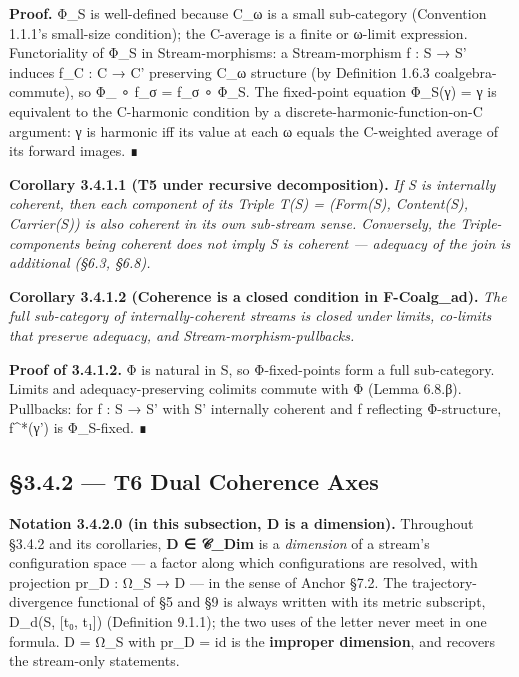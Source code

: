 \documentclass[11pt, openany]{book}
\begin{document}
\textbf{Proof.} Φ\_\allowbreak{}S is well-defined because C\_\allowbreak{}ω is a small sub-category (Convention 1.1.1's small-size condition); the C-average is a finite or ω-limit expression. Functoriality of Φ\_\allowbreak{}S in Stream-morphisms: a Stream-morphism f : S → S' induces f\_\allowbreak{}C : C → C' preserving C\_\allowbreak{}ω structure (by Definition 1.6.3 coalgebra-commute), so Φ\_ ∘ f\_\allowbreak{}σ = f\_\allowbreak{}σ ∘ Φ\_\allowbreak{}S. The fixed-point equation Φ\_\allowbreak{}S(γ) = γ is equivalent to the C-harmonic condition by a discrete-harmonic-function-on-C argument: γ is harmonic iff its value at each ω equals the C-weighted average of its forward images. ∎

\textbf{Corollary 3.4.1.1 (T5 under recursive decomposition).} \textit{If S is internally coherent, then each component of its Triple T(S) = (Form(S), Content(S), Carrier(S)) is also coherent in its own sub-stream sense. Conversely, the Triple-components being coherent does not imply S is coherent --- adequacy of the join is additional (§6.3, §6.8).}

\textbf{Corollary 3.4.1.2 (Coherence is a closed condition in F-Coalg\_\allowbreak{}ad).} \textit{The full sub-category of internally-coherent streams is closed under limits, co-limits that preserve adequacy, and Stream-morphism-pullbacks.}

\textbf{Proof of 3.4.1.2.} Φ is natural in S, so Φ-fixed-points form a full sub-category. Limits and adequacy-preserving colimits commute with Φ (Lemma 6.8.β). Pullbacks: for f : S → S' with S' internally coherent and f reflecting Φ-structure, f\textasciicircum{}*(γ') is Φ\_\allowbreak{}S-fixed. ∎

\subsection{§3.4.2 --- T6 Dual Coherence Axes}

\textbf{Notation 3.4.2.0 (in this subsection, D is a dimension).} Throughout §3.4.2 and its corollaries, \textbf{D ∈ 𝒞\_\allowbreak{}Dim} is a \textit{dimension} of a stream's configuration space --- a factor along which configurations are resolved, with projection pr\_\allowbreak{}D : Ω\_\allowbreak{}S → D --- in the sense of Anchor §7.2. The trajectory-divergence functional of §5 and §9 is always written with its metric subscript, D\_\allowbreak{}d(S, [t₀, t₁]) (Definition 9.1.1); the two uses of the letter never meet in one formula. D = Ω\_\allowbreak{}S with pr\_\allowbreak{}D = id is the \textbf{improper dimension}, and recovers the stream-only statements.
\end{document}

